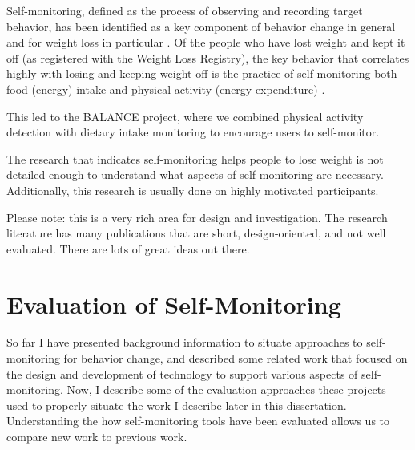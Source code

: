Self-monitoring, defined as the process of observing and recording target behavior, has been identified as a key component of behavior change in general \citep{kanfer_self-monitoring:_1970} and for weight loss in particular \citep{michie_effective_2009} \citep{burke_effect_2011}. Of the people who have lost weight and kept it off (as registered with the Weight Loss Registry), the key behavior that correlates highly with losing and keeping weight off is the practice of self-monitoring both food (energy) intake and physical activity (energy expenditure) \citep{yon_personal_2007, burke_experiences_2009}. 

This led to the BALANCE project, where we combined physical activity detection with dietary intake monitoring to  encourage users to self-monitor. 

The research that indicates self-monitoring helps people to lose weight is not detailed enough to understand what aspects of self-monitoring are necessary. Additionally, this research is usually done on highly motivated participants. 

Please note: this is a very rich area for design and investigation. The research literature has many publications that are short, design-oriented, and not well evaluated. There are lots of great ideas out there. 


\section{Evaluation of Self-Monitoring}
So far I have presented background information to situate approaches to self-monitoring for behavior change, and described some related work that focused on the design and development of technology to support various aspects of self-monitoring. Now, I describe some of the evaluation approaches these projects used to properly situate the work I describe later in this dissertation. Understanding the how self-monitoring tools have been evaluated allows us to compare new work to previous work. 

